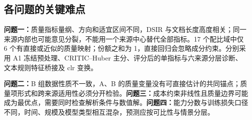\subsection{各问题的关键难点}
\textbf{问题一：}质量指标量纲、方向和适宜区间不同，DSIR 与文档长度高度相关；同一来源内部也可能意见分裂，不能用一个来源中心替代全部指标。17 个配比域中仅 6 个有直接或近似的质量映射；份额之和为 1，直接回归会忽略成分约束。分别采用 A1 冻结预处理、CRITIC--Huber 主分、评分后的单指标与六来源分层诊断、文本规则特征桥接及 clr 变换。

\textbf{问题二：}B 组数据性质不一致，A、B 的质量变量没有可直接估计的共同锚点；质量项形式和跨来源适用性必须分开检验。\textbf{问题三：}成本约束非线性且质量边界可能成为最优点，需要同时检查解析条件与数值解。\textbf{问题四：}能力分数与训练损失口径不同，时间、规模及模型类型相互混杂，预测应按可比性与情景分层。
